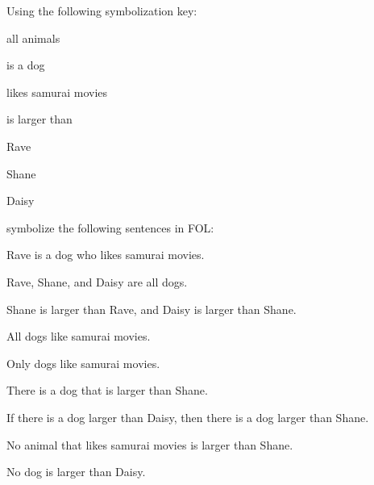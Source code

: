 \problempart 
Using the following symbolization key:
\begin{ekey}
\item[\text{论域}] all animals
\item[\atom{D}{x}]  is a dog
\item[\atom{S}{x}]  likes samurai movies
\item[\atom{L}{x,y}]  is larger than 
\item[r] Rave
\item[h] Shane
\item[d] Daisy
\end{ekey}
symbolize the following sentences in FOL:
\begin{compactlist}
\item Rave is a dog who likes samurai movies.
\item[] 
\item Rave, Shane, and Daisy are all dogs.
\item[] 
\item Shane is larger than Rave, and Daisy is larger than Shane.
\item[] 
\item All dogs like samurai movies.
\item[] 
\item Only dogs like samurai movies.
\item[] 
\item There is a dog that is larger than Shane.
\item[] 
\item If there is a dog larger than Daisy, then there is a dog larger than Shane.
\item[] 
\item No animal that likes samurai movies is larger than Shane.
\item[] 
\item No dog is larger than Daisy.

\end{compactlist}
